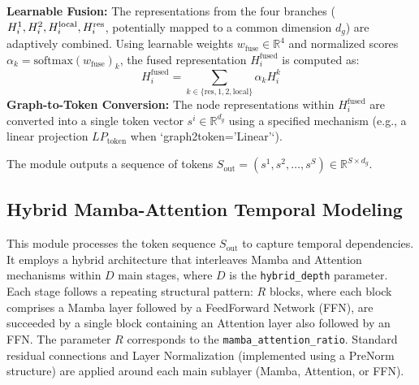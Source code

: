 \documentclass[runningheads]{llncs}
\begin{document}
\textbf{Learnable Fusion:} The representations from the four branches ($H^1_i, H^2_i, \\H^{\text{local}}_i, H^{\text{res}}_i$, potentially mapped to a common dimension $d_g$) are adaptively combined. Using learnable weights $w_{\text{fuse}} \in \mathbb{R}^4$ and normalized scores $\alpha_k = \text{softmax}(w_{\text{fuse}})_k$, the fused representation $H^{\text{fused}}_i$ is computed as:
\begin{equation}
    H^{\text{fused}}_i = \sum_{k \in \{\text{res}, 1, 2, \text{local}\}} \alpha_k H^k_i
    \label{eq:fusion_v3}
\end{equation}
\textbf{Graph-to-Token Conversion:} The node representations within $H^{\text{fused}}_i$ are converted into a single token vector $s^i \in \mathbb{R}^{d_g}$ using a specified mechanism (e.g., a linear projection $LP_{\text{token}}$ when `graph2token='Linear'`).

The module outputs a sequence of tokens $S_{\text{out}} = (s^1, s^2, \dots, s^S) \in \mathbb{R}^{S \times d_g}$.

\subsection{Hybrid Mamba-Attention Temporal Modeling}

\label{subsec:temporal_modeling_v3}

This module processes the token sequence $S_{\text{out}}$ to capture temporal dependencies. It employs a hybrid architecture that interleaves Mamba and Attention mechanisms within $D$ main stages, where $D$ is the \texttt{hybrid\_depth} parameter. Each stage follows a repeating structural pattern: $R$ blocks, where each block comprises a Mamba layer followed by a FeedForward Network (FFN), are succeeded by a single block containing an Attention layer also followed by an FFN. The parameter $R$ corresponds to the \texttt{mamba\_attention\_ratio}. Standard residual connections and Layer Normalization (implemented using a PreNorm structure) are applied around each main sublayer (Mamba, Attention, or FFN).
\end{document}
